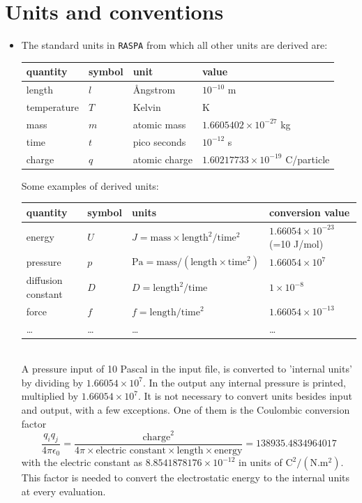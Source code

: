 \section{Units and conventions}
\begin{itemize}
  \item{The standard units in \texttt{RASPA} from which all other units are derived are:}\\
\vskip 0.1cm
\begin{tabularx}{\linewidth}{l|l|l|l}
 quantity & symbol & unit & value\\
\hline
 length      & $l$    & \AA ngstrom   & $10^{-10}$ m\\
 temperature & $T$    & Kelvin        & K\\
 mass        & $m$    & atomic mass   & $1.6605402\times 10^{-27}$ kg\\
 time        & $t$    & pico seconds  & $10^{-12}$ s\\
 charge      & $q$    & atomic charge & $1.60217733\times 10^{-19}$ C/particle\\
\hline
\end{tabularx}
\vskip 0.1cm

\noindent Some examples of derived units:\\

\begin{tabularx}{\linewidth}{l|l|l|l}
 quantity & symbol & units & conversion value\\
\hline
 energy             & $U$    & $J=\text{mass}\times\text{length}^2/\text{time}^2$ & $1.66054\times10^{-23}$ (=10 J/mol)\\
 pressure           & $p$    & $\text{Pa}=\text{mass}/(\text{length}\times\text{time}^2)$  & $1.66054\times10^7$\\
 diffusion constant & $D$    & $D=\text{length}^2/\text{time}$ & $1\times10^{-8}$\\
 force              & $f$    & $f=\text{length}/\text{time}^2$ & $1.66054\times 10^{-13}$\\
 \dots              & \dots  & \dots                                & \dots \\
\hline
\end{tabularx}\\

A pressure input of 10 Pascal in the input file, is converted to 'internal units' by dividing by $1.66054\times10^7$. In the
output any internal pressure is printed, multiplied by $1.66054\times10^7$. It is not necessary to convert units besides
input and output, with a few exceptions. One of them is the Coulombic conversion factor
\begin{equation}
  \frac{q_i q_j}{4\pi \epsilon_0}=\frac{\text{charge}^2}{4 \pi \times \text{electric constant}\times\text{length}\times\text{energy}}=138935.4834964017
\end{equation}
with the electric constant as $8.8541878176\times10^{-12}$ in units of $\text{C}^2/(\text{N}.\text{m}^2)$. This factor is needed to convert the
electrostatic energy to the internal units at every evaluation. 


\end{itemize}
